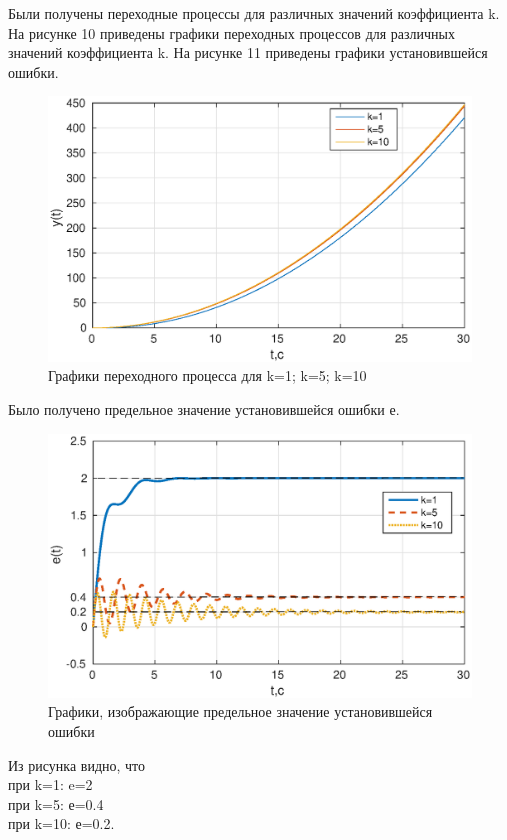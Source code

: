 \documentclass[12pt,a4paper]{article}
\begin{document}
Были получены переходные процессы для различных значений коэффициента  k.
На рисунке 10 приведены графики переходных процессов  для различных значений коэффициента  k.
На рисунке 11 приведены графики установившейся ошибки.
\begin{figure}[H]
\centering
\includegraphics[width=\textwidth]{1/2_2y(t).eps}
\caption{Графики переходного процесса для k=1; k=5; k=10}
\end{figure}
Было получено предельное значение установившейся ошибки е.

\begin{figure}[H]
\centering
\includegraphics[width=\textwidth]{1/2_2e(t).eps}
\caption{Графики, изображающие предельное значение установившейся ошибки}
\end{figure}

Из рисунка видно, что
\\при k=1:  e=2
\\при k=5: е=0.4
\\при k=10: е=0.2.
\end{document}
